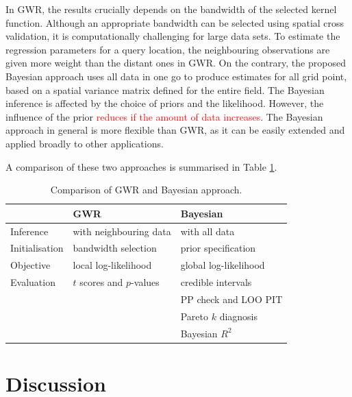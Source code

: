 \documentclass[a4paper]{article}   	%
\begin{document}
	
	In GWR, the results crucially depends on the bandwidth of the selected kernel function. Although an appropriate bandwidth can be selected using spatial cross validation, it is computationally challenging for large data sets. To estimate the regression parameters for a query location, the neighbouring observations are given more weight than the distant ones in GWR. On the contrary, the proposed Bayesian approach uses all data in one go to produce estimates for all grid point, based on a spatial variance matrix defined for the entire field. The Bayesian inference is affected by the choice of priors and the likelihood. However, the influence of the prior \textcolor{red}{reduces if the amount of data increases}. The Bayesian approach in general is more flexible than GWR, as it can be easily extended and applied broadly to other applications. 
	
	
	A comparison of these two approaches is summarised in Table \ref{tb:compareGWR}. 
	\begin{table}[!htp]
		\centering
		\begin{tabular}{*{3}{l}} \toprule
			& GWR & Bayesian \\ \midrule
			Inference	& with neighbouring data & with all data \\ 	 
			Initialisation	& bandwidth selection &  prior specification \\ 	
			Objective	& local log-likelihood & global log-likelihood \\  \midrule
			Evaluation	&  $t$ scores and $p$-values & credible intervals \\
			&  & PP check and LOO PIT \\
			&  & Pareto $k$ diagnosis \\
			&  & Bayesian $R^2$ \\ 
			\bottomrule
		\end{tabular}
		\caption{Comparison of GWR and Bayesian approach.}\label{tb:compareGWR}
	\end{table}
	
	
	\section{Discussion}
	
\end{document}
